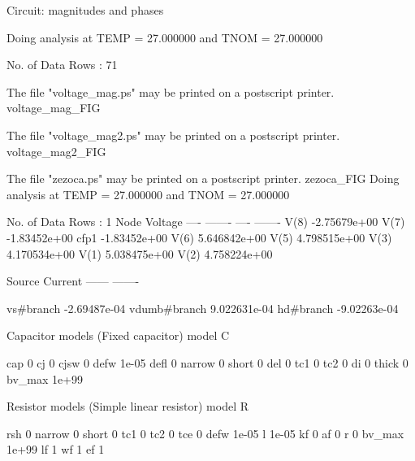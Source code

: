 
Circuit: magnitudes and phases

Doing analysis at TEMP = 27.000000 and TNOM = 27.000000


No. of Data Rows : 71

The file "voltage_mag.ps" may be printed on a postscript printer.
voltage_mag_FIG

The file "voltage_mag2.ps" may be printed on a postscript printer.
voltage_mag2_FIG

The file "zezoca.ps" may be printed on a postscript printer.
zezoca_FIG
Doing analysis at TEMP = 27.000000 and TNOM = 27.000000


No. of Data Rows : 1
	Node                                  Voltage
	----                                  -------
	----	-------
	V(8)                             -2.75679e+00
	V(7)                             -1.83452e+00
	cfp1                             -1.83452e+00
	V(6)                             5.646842e+00
	V(5)                             4.798515e+00
	V(3)                             4.170534e+00
	V(1)                             5.038475e+00
	V(2)                             4.758224e+00

	Source	Current
	------	-------

	vs#branch                        -2.69487e-04
	vdumb#branch                     9.022631e-04
	hd#branch                        -9.02263e-04

 Capacitor models (Fixed capacitor)
      model                     C

        cap                     0
         cj                     0
       cjsw                     0
       defw                 1e-05
       defl                     0
     narrow                     0
      short                     0
        del                     0
        tc1                     0
        tc2                     0
         di                     0
      thick                     0
     bv_max                 1e+99

 Resistor models (Simple linear resistor)
      model                     R

        rsh                     0
     narrow                     0
      short                     0
        tc1                     0
        tc2                     0
        tce                     0
       defw                 1e-05
          l                 1e-05
         kf                     0
         af                     0
          r                     0
     bv_max                 1e+99
         lf                     1
         wf                     1
         ef                     1


